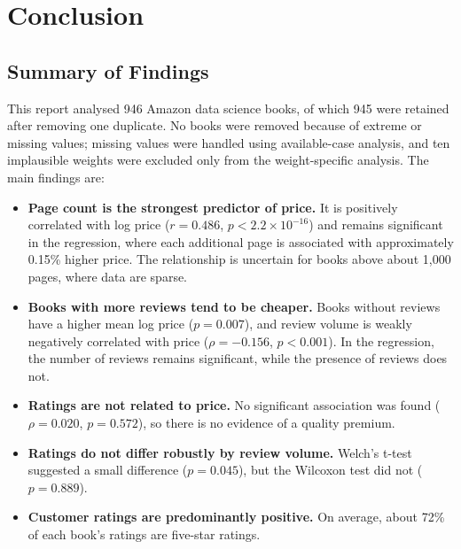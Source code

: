 \documentclass[11pt,a4paper]{article}
\begin{document}
\newpage
\section{Conclusion}
\begingroup
{}
\setlength{\parskip}{4pt}

\subsection{Summary of Findings}

This report analysed 946 Amazon data science books, of which 945 were retained after removing one duplicate. No books were removed because of extreme or missing values; missing values were handled using available-case analysis, and ten implausible weights were excluded only from the weight-specific analysis. The main findings are:

\begin{itemize}
    \setlength{\itemsep}{2pt}
    \item \textbf{Page count is the strongest predictor of price.} It is positively correlated with log price ($r = 0.486$, $p < 2.2 \times 10^{-16}$) and remains significant in the regression, where each additional page is associated with approximately 0.15\% higher price. The relationship is uncertain for books above about 1{,}000 pages, where data are sparse.

    \item \textbf{Books with more reviews tend to be cheaper.} Books without reviews have a higher mean log price ($p = 0.007$), and review volume is weakly negatively correlated with price ($\rho = -0.156$, $p < 0.001$). In the regression, the number of reviews remains significant, while the presence of reviews does not.

    \item \textbf{Ratings are not related to price.} No significant association was found ($\rho = 0.020$, $p = 0.572$), so there is no evidence of a quality premium.

    \item \textbf{Ratings do not differ robustly by review volume.} Welch's t-test suggested a small difference ($p = 0.045$), but the Wilcoxon test did not ($p = 0.889$).

    \item \textbf{Customer ratings are predominantly positive.} On average, about 72\% of each book's ratings are five-star ratings.
\end{itemize}
\end{document}
